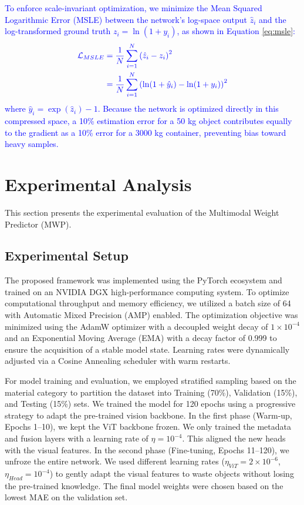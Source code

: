 \documentclass[journal,twoside,web]{ieeecolor}
\newcommand{\x}[1]{\textcolor{blue}{#1}}
\begin{document}
\x{To enforce scale-invariant optimization, we minimize the Mean Squared Logarithmic Error (MSLE) between the network's log-space output $\hat{z}_i$ and the log-transformed ground truth $z_i = \ln(1+y_i)$, as shown in Equation \eqref{eq:msle}:}
\begin{equation}
\color{blue}
\label{eq:msle}
\begin{aligned}
\mathcal{L}_{MSLE}
&= \frac{1}{N} \sum_{i=1}^{N} \left( \hat{z}_i - z_i \right)^2 \\
&= \frac{1}{N} \sum_{i=1}^{N}
\left( \ln(1+\hat{y}_i) - \ln(1+y_i) \right)^2
\end{aligned}
\end{equation}
\x{where $\hat{y}_i = \exp(\hat{z}_i) - 1$. Because the network is optimized directly in this compressed space, a 10\% estimation error for a 50 kg object contributes equally to the gradient as a 10\% error for a 3000 kg container, preventing bias toward heavy samples.}


\section{Experimental Analysis}
\label{sec:experimental_analysis}
This section presents the experimental evaluation of the Multimodal Weight Predictor (MWP). 

\subsection{Experimental Setup}
The proposed framework was implemented using the PyTorch ecosystem and trained on an NVIDIA DGX high-performance computing system. To optimize computational throughput and memory efficiency, we utilized a batch size of 64 with Automatic Mixed Precision (AMP) enabled. The optimization objective was minimized using the AdamW optimizer with a decoupled weight decay of $1 \times 10^{-4}$ and an Exponential Moving Average (EMA) with a decay factor of 0.999 to ensure the acquisition of a stable model state. Learning rates were dynamically adjusted via a Cosine Annealing scheduler with warm restarts.

For model training and evaluation, we employed stratified sampling based on the material category to partition the dataset into Training (70\%), Validation (15\%), and Testing (15\%) sets. We trained the model for 120 epochs using a progressive strategy to adapt the pre-trained vision backbone. In the first phase (Warm-up, Epochs 1--10), we kept the ViT backbone frozen. We only trained the metadata and fusion layers with a learning rate of $\eta = 10^{-4}$. This aligned the new heads with the visual features. In the second phase (Fine-tuning, Epochs 11--120), we unfroze the entire network. We used different learning rates ($\eta_{ViT} = 2 \times 10^{-6}$, $\eta_{Head} = 10^{-4}$) to gently adapt the visual features to waste objects without losing the pre-trained knowledge. The final model weights were chosen based on the lowest MAE on the validation set.
\end{document}
